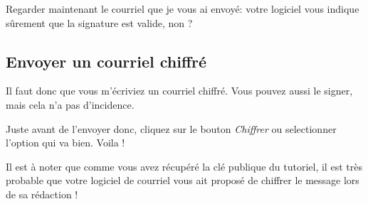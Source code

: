 Regarder maintenant le courriel que je vous ai envoyé: votre logiciel
vous indique sûrement que la signature est valide, non ?

\subsection{Envoyer un courriel
chiffré}\label{envoyer-un-courriel-chiffruxe9}

Il faut donc que vous m'écriviez un courriel chiffré. Vous pouvez aussi
le signer, mais cela n'a pas d'incidence.

Juste avant de l'envoyer donc, cliquez sur le bouton \emph{Chiffrer} ou
selectionner l'option qui va bien. Voila !

Il est à noter que comme vous avez récupéré la clé publique du tutoriel,
il est très probable que votre logiciel de courriel vous ait proposé de
chiffrer le message lors de sa rédaction !
